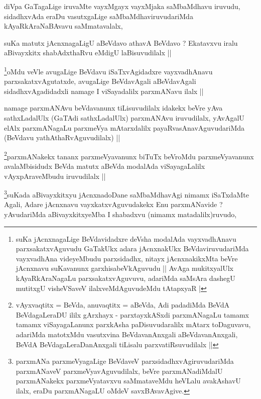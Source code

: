 \begin{artha}
diVpa GaTagaLige iruvaMte vayxMgayx vayxMjaka saMbaMdhavu iruvudu,
sidadhxvAda eraDu vasutxgaLige saMbaMdhaviruvudariMda
kAyaRkAraNaBAvavu saMmatavalalx,
\end{artha}

\begin{artha}
suKa matutx jAcnxnagaLigU aBeVdavo athavA BeVdavo ? Ekatavxvu iralu
aBivayxkitx shabAdxthaRvu eMdigU laBisuvudilalx ||
\end{artha}

\begin{artha}
\footnote{suKa jAcnxnagaLige BeVdavidadxre deVsha modalAda
  vayxvadhAnavu parxsakatxvAguvudu GaTakUkx adara jAcnxnakUkx
  BeVdaviruvudariMda vayxvadhAna videyeMbudu parxsidadhx, nitayx
  jAcnxnakikxMta beVre jAcnxnavu suKavanunx garxhisabeVkAguvudu ||
  AvAga mukitxyalUlx kAyaRkAraNagaLu parxsakatxvAguvuvu, adariMda
  saMsAra dashegU mutitxgU visheVSaveV ilalxveMdAguvudeMdu tAtapxyaR |}oMdu veVle avugaLige BeVdavu iSaTxvAgidadxre vayxvadhAnavu
parxsakatxvAgutatxde, avugaLige BeVdavAgali aBeVdavAgali
sidadhxvAgadidadxli namage I viSayadalilx parxmANavu ilalx ||
\end{artha}

\begin{artha}
namage parxmANAvu beVdavanunx tiLisuvudilalx idakekx beVre yAva
sathxLadalUlx (GaTAdi sathxLadalUlx) parxmANAvu iruvudilalx, yAvAgalU
elAlx parxmANagaLu parxmeVya mAtarxdalilx payaRvasAnavAguvudariMda
(BeVdavu yathAthaRvAguvudilalx) ||
\end{artha}

\begin{artha}
\footnote{vAyxvaqtitx = BeVda, anuvaqtitx = aBeVda, Adi padadiMda
  BeVdA BeVdagaLeraDU ililx gArxhayx - parxtayxkASxdi parxmANagaLu
  tamamx tamamx viSayagaLanunx parxkAsha paDisuvudaralilx mAtarx
  toDaguvavu, adariMda matotxMdu vasutxvina BeVdavanAnxgali
  aBeVdavanAnxgali, BeVdA BeVdagaLeraDanAnxgali tiLisalu
  parxvatiRsuvudilalx ||}parxmANakekx tananx parxmeVyavanunx biTuTx beVroMdu
parxmeVyavanunx avalaMbisidudx BeVda matutx aBeVda modalAda
viSayagaLalilx vAyxpAraveMbudu iruvudilalx ||
\end{artha}

\begin{artha}
\footnote{parxmANa parxmeVyagaLige BeVdaveV parxsidadhxvAgiruvudariMda
  parxmANaveV parxmeVyavAguvudilalx, beVre parxmANadiMdalU
  parxmANakekx parxmeVyatavxvu saMmataveMdu heVLalu avakAshavU ilalx,
  eraDu parxmANagaLU oMdeV savxBAvavAgive.}suKada aBivayxkitxyu jAcnxnadoDane saMbaMdhavAgi nimamx
iSaTxdaMte Agali, Adare jAcnxnavu vayxkatxvAguvudakekx Enu
parxmANavide ? yAvudariMda aBivayxkitxyeMba I shabadxvu (nimamx
matadalilx)ruvudo, 
\end{artha}

